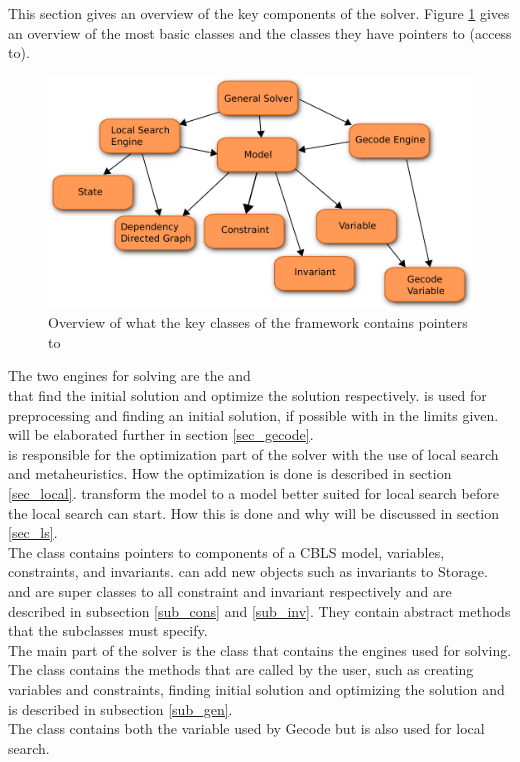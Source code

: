 This section gives an overview of the key components of the solver. Figure \ref{fig_architec} gives an overview 
of the most basic classes and the classes they have pointers to (access to). 

\begin{figure}[!b]
\includegraphics[width=\linewidth]{architectureTest}\caption{Overview of what the key classes of the framework contains 
pointers to} 
\label{fig_architec}
\end{figure} \noindent
The two engines for solving are the \gecodesol and \\ \lssol that find the initial solution and optimize the solution 
respectively. \gecodesol is used for preprocessing and finding an initial solution, if possible with in the limits 
given. \gecodesol will be elaborated further in section \ref{sec_gecode}. \\
\lssol is responsible for the optimization part of the solver with the use of local search and 
metaheuristics. How the optimization is done is described in section \ref{sec_local}. \lssol 
transform the model to a model better suited for local search before the local search can start. How this is done and 
why will be discussed in section \ref{sec_ls}. \\ 
The  class contains pointers to components of a CBLS model, variables, constraints, and invariants. 
\lssol can add new objects such as invariants to Storage. \\ 
 and  are super classes to all constraint and invariant respectively and are 
described in subsection \ref{sub_cons} and \ref{sub_inv}. They contain abstract methods that the subclasses must 
specify. \\ 
The main part of the solver is the  class that contains the engines used for solving.
The  class contains the methods that are called by the user, such as creating variables and 
constraints, finding initial solution and optimizing the solution and is described in subsection \ref{sub_gen}. \\ 
The  class contains both the variable used by Gecode but is also used for local search. 
